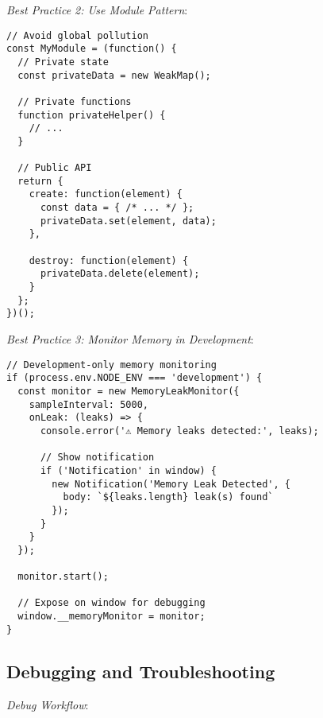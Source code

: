 \documentclass[11pt]{article}
\begin{document}
\emph{Best Practice 2: Use Module Pattern}:

\begin{verbatim}
// Avoid global pollution
const MyModule = (function() {
  // Private state
  const privateData = new WeakMap();
  
  // Private functions
  function privateHelper() {
    // ...
  }
  
  // Public API
  return {
    create: function(element) {
      const data = { /* ... */ };
      privateData.set(element, data);
    },
    
    destroy: function(element) {
      privateData.delete(element);
    }
  };
})();
\end{verbatim}

\emph{Best Practice 3: Monitor Memory in Development}:

\begin{verbatim}
// Development-only memory monitoring
if (process.env.NODE_ENV === 'development') {
  const monitor = new MemoryLeakMonitor({
    sampleInterval: 5000,
    onLeak: (leaks) => {
      console.error('⚠️ Memory leaks detected:', leaks);
      
      // Show notification
      if ('Notification' in window) {
        new Notification('Memory Leak Detected', {
          body: `${leaks.length} leak(s) found`
        });
      }
    }
  });
  
  monitor.start();
  
  // Expose on window for debugging
  window.__memoryMonitor = monitor;
}
\end{verbatim}
\subsection{Debugging and Troubleshooting}
\label{sec:org678a7b1}

\emph{Debug Workflow}:
\end{document}
